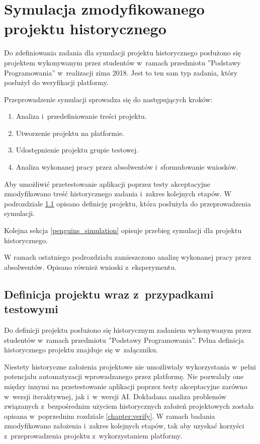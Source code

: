 \section{Symulacja zmodyfikowanego projektu historycznego}
\label{research_penguins}

Do zdefiniowania zadania dla symulacji projektu historycznego posłużono się projektem wykonywanym przez studentów w~ramach przedmiotu ”Podstawy Programowania” w~realizacji zima 2018.
Jest to ten sam typ zadania, który posłużył do weryfikacji platformy.

Przeprowadzenie symulacji sprowadza się do następujących kroków:
\begin{enumerate}
    \item Analiza i~przedefiniowanie treści projektu.
    \item Utworzenie projektu na platformie.
    \item Udostępnienie projektu grupie testowej.
    \item Analiza wykonanej pracy przez absolwentów i~sformułowanie wniosków.
\end{enumerate}

Aby umożliwić przetestowanie aplikacji poprzez testy akceptacyjne zmodyfikowano treść historycznego zadania i~zakres kolejnych etapów.
W podrozdziale \ref{penguins_project_definition} opisano definicję projektu, która posłużyła do przeprowadzenia symulacji.

Kolejna sekcja \ref{penguins_simulation} opisuje przebieg symulacji dla projektu historycznego.

W ramach ostatniego podrozdziału zamieszczono analizę wykonanej pracy przez absolwentów.
Opisano również wnioski z~eksperymentu.


\subsection{Definicja projektu wraz z~przypadkami testowymi}
\label{penguins_project_definition}

Do definicji projektu posłużono się historycznym zadaniem wykonywanym przez studentów w~ramach przedmiotu ”Podstawy Programowania”.
Pełna definicja historycznego projektu znajduje się w~załączniku.

Niestety historyczne założenia projektowe nie umożliwiały wykorzystania w~pełni potencjału automatyzacji wprowadzanego przez platformę.
Nie pozwalały one między innymi na przetestowanie aplikacji poprzez testy akceptacyjne zarówno w~wersji iteraktywnej, jak i~w~wersji AI.
Dokładana analiza problemów związanych z~bezpośrednim użyciem historycznych założeń projektowych została opisana w~poprzednim rozdziale \ref{chapter:verify}.
W ramach badania zmodyfikowano założenia i~zakres kolejnych etapów, tak aby uzyskać korzyści z~przeprowadzenia projektu z~wykorzystaniem platformy.

